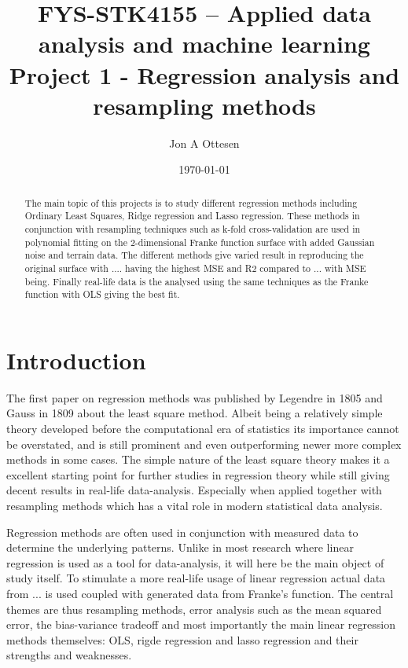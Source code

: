 \documentclass[uio,jmp,amsmath,amssymb,reprint,nofootinbib]{revtex4-1}
\numberwithin{equation}{section}
\begin{document}
\title{FYS-STK4155 – Applied data analysis and machine learning\\ Project 1 - Regression analysis and resampling methods}%

\author{Jon A Ottesen}
\date{\today}

\begin{abstract}
The main topic of this projects is to study different regression methods including Ordinary Least Squares, Ridge regression and Lasso regression. These methods in conjunction with resampling techniques such as k-fold cross-validation are used in polynomial fitting on the 2-dimensional Franke function surface with added Gaussian noise and terrain data. The different methods give varied result in reproducing the original surface with .... having the highest MSE and R2 compared to ... with MSE being. Finally real-life data is the analysed using the same techniques as the Franke function with OLS giving the best fit.

\end{abstract}

\maketitle


\section{Introduction}\label{sec:Introduction}

The first paper on regression methods was published by Legendre in 1805 and Gauss in 1809 about the least square method\cite{wiki:Regression_analysis}. Albeit being a relatively simple theory developed before the computational era of statistics its importance cannot be overstated, and is still prominent and even outperforming newer more complex methods in some cases. The simple nature of the least square theory makes it a excellent starting point for further studies in regression theory while still giving decent results in real-life data-analysis. Especially when applied together with resampling methods which has a vital role in modern statistical data analysis.

Regression methods are often used in conjunction with measured data to determine the underlying patterns. Unlike in most research where linear regression is used as a tool for data-analysis, it will here be the main object of study itself. To stimulate a more real-life usage of linear regression actual data from ... is used coupled with generated data from  Franke's function. The central themes are thus resampling methods, error analysis such as the mean squared error, the bias-variance tradeoff and most importantly the main linear regression methods themselves: OLS, rigde regression and lasso regression and their strengths and weaknesses.
\end{document}
